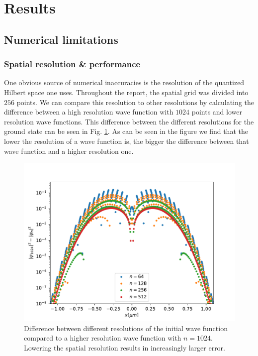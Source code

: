 \documentclass[a4paper, twocolumn]{revtex4-1}
\begin{document}
\section{Results}\label{sec:results}
\subsection{\label{subsec:numericalLimitations} Numerical limitations}
\subsubsection{Spatial resolution \& performance}
One obvious source of numerical inaccuracies is the resolution of the quantized Hilbert space one uses. Throughout the report, the spatial grid was divided into $256$ points. We can compare this resolution to other resolutions by calculating the difference between a high resolution wave function with $1024$ points and lower resolution wave functions. This difference between the different resolutions for the ground state can be seen in Fig. \ref{fig:groundstateGrid}. As can be seen in the figure we find that the lower the resolution of a wave function is, the bigger the difference between that wave function and a higher resolution one. \\
\begin{figure}
	\includegraphics[width=\columnwidth]{graphics/stateAnalysis/GroundstateGrid.pdf}
	\caption{Difference between different resolutions of the initial wave function compared to a higher resolution wave function with $n = 1024$. Lowering the spatial resolution results in increasingly larger error.}
	\label{fig:groundstateGrid}
\end{figure}
\end{document}
